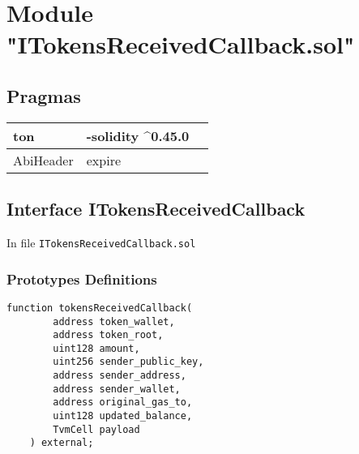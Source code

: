
\section{Module "ITokensReceivedCallback.sol"}


\subsection{Pragmas}


\noindent\begin{tabular}{|l|l|p{5cm}|}\hline
ton & -solidity \^{}0.45.0 &\\\hline
AbiHeader &  expire &\\\hline
\end{tabular}


\subsection{Interface ITokensReceivedCallback}


In file {\tt ITokensReceivedCallback.sol}

\subsubsection{Prototypes Definitions}

\vspace{2cm}

\begin{lstlisting}[firstnumber=5]
    function tokensReceivedCallback(
        address token_wallet,
        address token_root,
        uint128 amount,
        uint256 sender_public_key,
        address sender_address,
        address sender_wallet,
        address original_gas_to,
        uint128 updated_balance,
        TvmCell payload
    ) external;
\end{lstlisting}
